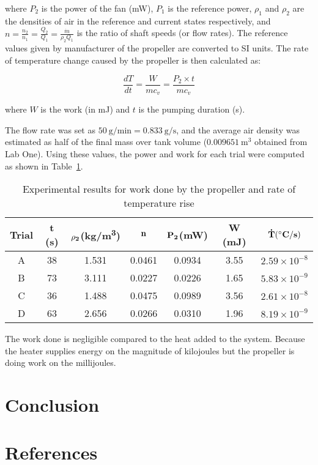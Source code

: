 \documentclass[12pt]{article}
\begin{document}
where \( P_{2} \) is the power of the fan (mW), \( P_{1} \) is the reference power, \( \rho_{1} \) and \( \rho_{2} \) are the densities of air in the reference and current states respectively, and \( n = \frac{n_{2}}{n_{1}} = \frac{Q_{2}}{Q_{1}} = \frac{\dot m}{\rho_2 Q_1}\) is the ratio of shaft speeds (or flow rates).  The reference values given by manufacturer of the propeller are converted to SI units.
The rate of temperature change caused by the propeller is then calculated as:

\begin{equation}
    \frac{dT}{dt} = \frac{W}{mc_v} = \frac{P_{2} \times t}{mc_v}
\end{equation}

where \( W \) is the work (in mJ) and \( t \) is the pumping duration (s).

The flow rate was set as \( 50~\text{g/min} = 0.833~\text{g/s} \), and the average air density was estimated as half of the final mass over tank volume (\( 0.009651~\text{m}^{3} \) obtained from Lab One). Using these values, the power and work for each trial were computed as shown in Table~\ref{tab:results}.

\begin{table}[h!]
\centering
\caption{Experimental results for work done by the propeller and rate of temperature rise}
\label{tab:results}
\begin{tabular}{|c|c|c|c|c|c|c|}
\hline
\textbf{Trial} & \textbf{\bf t (s)} & \textbf{$\bf \rho_2$(kg/m\textsuperscript{3})} & \textbf{$\bf n$} & \textbf{$\bf P_2$(mW)} & \textbf{W (mJ)} & $\bf \dot T (^{\circ} C/s)$ \\ \hline
A & 38 & 1.531 & 0.0461 & 0.0934 & 3.55 & $2.59\times10^{-8}$\\ \hline
B & 73 & 3.111 & 0.0227 & 0.0226 & 1.65 & $5.83\times10^{-9}$\\ \hline
C & 36 & 1.488 & 0.0475 & 0.0989 & 3.56 & $2.61\times10^{-8}$\\ \hline
D & 63 & 2.656 & 0.0266 & 0.0310 & 1.96 & $8.19\times10^{-9}$\\ \hline
\end{tabular}
\end{table}

The work done is negligible compared to the heat added to the system. Because the heater supplies energy on the magnitude of kilojoules but the propeller is doing work on the millijoules.

\section{Conclusion}


\section{References}






\newpage
\begin{thebibliography}{9}

\end{thebibliography}
\end{document}
